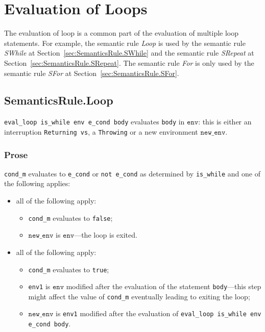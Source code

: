 \documentclass{book}
\newcommand\secref[1]{Section~\ref{sec:#1}}
\newcommand\newenv[0]{\texttt{new\_env}}
\newcommand\env[0]{\texttt{env}}
\begin{document}

\chapter{Evaluation of Loops \label{chap:eval_loops}}

The evaluation of loop is a common part of the evaluation of multiple loop
statements.
%
For example, the semantic rule \emph{Loop} is used by the semantic rule
\emph{SWhile} at \secref{SemanticsRule.SWhile} and the semantic rule
\emph{SRepeat} at \secref{SemanticsRule.SRepeat}.
%
The semantic rule \emph{For} is only used by the semantic rule \emph{SFor} at
\secref{SemanticsRule.SFor}.

\section{SemanticsRule.Loop \label{sec:SemanticsRule.Loop}}
\texttt{eval\_loop is\_while env e\_cond body} evaluates \texttt{body} in
$\env$: this is either an interruption \texttt{Returning vs}, a
\texttt{Throwing} or a new environment $\newenv$.

    \subsection{Prose}
    \texttt{cond\_m} evaluates to \texttt{e\_cond} or \texttt{not e\_cond} as
determined by \texttt{is\_while} and one of the following applies:
    \begin{itemize}
    \item all of the following apply:
      \begin{itemize}
      \item \texttt{cond\_m} evaluates to \texttt{false};
      \item $\newenv$ is $\env$---the loop is exited.
      \end{itemize}
    \item all of the following apply:
      \begin{itemize}
      \item \texttt{cond\_m} evaluates to \texttt{true};
      \item \texttt{env1} is $\env$ modified after the evaluation of the
statement \texttt{body}---this step might affect the value of \texttt{cond\_m}
eventually leading to exiting the loop;
      \item $\newenv$ is \texttt{env1} modified after the evaluation of
\texttt{eval\_loop is\_while env e\_cond body}.
      \end{itemize}
    \end{itemize}
\end{document}
